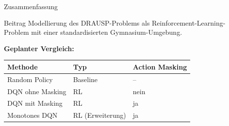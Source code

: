 \documentclass[aspectratio=169]{beamer}
\begin{document}
\begin{frame}{Zusammenfassung}

  \begin{block}{Beitrag}
    Modellierung des DRAUSP-Problems als Reinforcement-Learning-Problem
    mit einer standardisierten Gymnasium-Umgebung.
  \end{block}
  \bigskip
  \textbf{Geplanter Vergleich:}

  \medskip
  \begin{tabular}{lll}
    \hline
    \textbf{Methode} & \textbf{Typ} & \textbf{Action Masking} \\
    \hline
    Random Policy        & Baseline         & {--} \\
    DQN ohne Masking     & RL               & \textcolor{alertred}{nein} \\
    DQN mit Masking      & RL               & \textcolor{tugreen}{ja} \\
    Monotones DQN        & RL (Erweiterung) & \textcolor{tugreen}{ja} \\
    \hline
  \end{tabular}

\end{frame}
\end{document}
